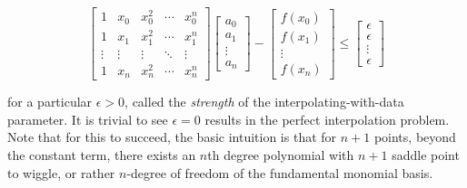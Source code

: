 \begin{equation}\label{eq:soft_hard_interpolation}
\begin{bmatrix}
1 & x_0 & x_0^2 & \cdots & x_0^n \\
1 & x_1 & x_1^2 & \cdots & x_1^n \\
\vdots & \vdots & \vdots & \ddots & \vdots \\
1 & x_n & x_n^2 & \cdots & x_n^n
\end{bmatrix}
\begin{bmatrix}
a_0 \\
a_1 \\
\vdots \\
a_n
\end{bmatrix}
- 
\begin{bmatrix}
f(x_0) \\
f(x_1) \\
\vdots \\
f(x_n)
\end{bmatrix}
\leq 
\begin{bmatrix}
  \epsilon\\
  \epsilon \\
  \vdots \\
  \epsilon
\end{bmatrix}
\end{equation}

for a particular $\epsilon > 0$, called the \textit{strength} of the interpolating-with-data parameter. It is trivial to see $\epsilon = 0$ results in the perfect interpolation problem. Note that for this to succeed, the basic intuition is that for $n+1$ points, beyond the constant term, there exists an $n$th degree polynomial with $n+1$ saddle point to wiggle, or rather $n$-degree of freedom of the fundamental monomial basis. 